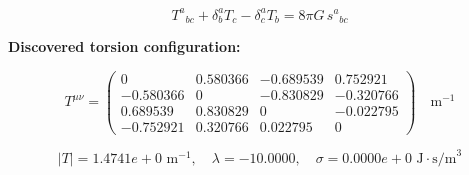 
\begin{equation}
  T^a{}_{bc} + \delta^a_b T_c - \delta^a_c T_b = 8\pi G \, s^a{}_{bc}
\end{equation}

\textbf{Discovered torsion configuration:}

\begin{equation}
  T^{\mu\nu} = \begin{pmatrix}
    0 & 0.580366 & -0.689539 & 0.752921 \\
    -0.580366 & 0 & -0.830829 & -0.320766 \\
    0.689539 & 0.830829 & 0 & -0.022795 \\
    -0.752921 & 0.320766 & 0.022795 & 0
  \end{pmatrix} \quad \text{m}^{-1}
\end{equation}

\begin{equation}
  |T| = 1.4741e+0 \text{ m}^{-1}, \quad
  \lambda = -10.0000, \quad
  \sigma = 0.0000e+0 \text{ J}\cdot\text{s/m}^3
\end{equation}